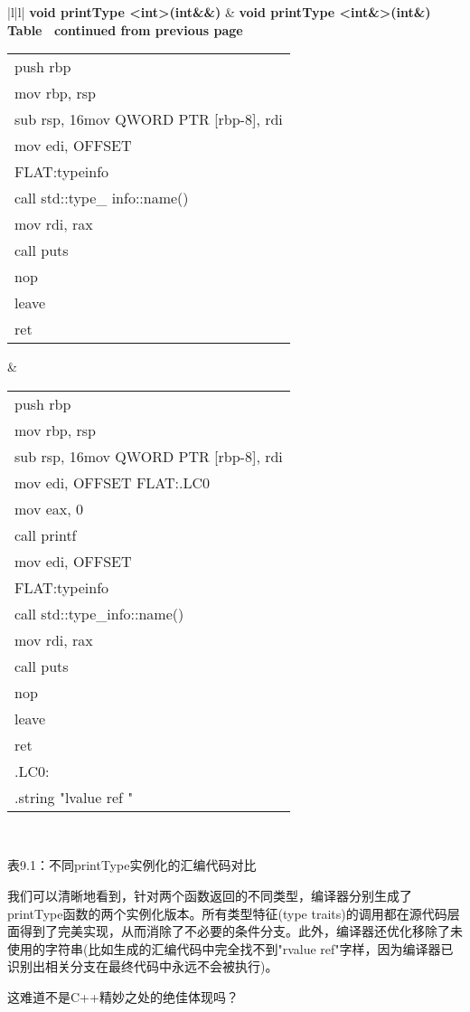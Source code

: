 \begin{longtable}{|l|l|}
\hline
\textbf{void printType <int>(int\&\&)} &
  \textbf{void printType <int\&>(int\&)} \\ \hline
\endfirsthead
%
%
{{\bfseries Table \thetable\ continued from previous page}} \\
\endhead
%
\begin{tabular}[c]{@{}l@{}}push rbp\\ mov rbp, rsp\\ sub rsp, 16mov QWORD PTR [rbp-8], rdi\\ mov edi, OFFSET \\                   FLAT:typeinfo \\ call std::type\_ info::name() \\ mov rdi, rax\\ call puts \\ nop \\ leave \\ ret\end{tabular} &
  \begin{tabular}[c]{@{}l@{}}push rbp\\ mov rbp, rsp\\ sub rsp, 16mov QWORD PTR [rbp-8], rdi\\ mov edi, OFFSET FLAT:.LC0 \\ mov eax, 0 \\ call printf \\ mov edi, OFFSET \\                  FLAT:typeinfo \\ call std::type\_info::name() \\ mov rdi, rax\\ call puts \\ nop \\ leave \\ ret \\   .LC0:\\     .string "lvalue ref "\end{tabular} \\ \hline
\end{longtable}

\begin{center}
表9.1：不同printType实例化的汇编代码对比
\end{center}

我们可以清晰地看到，针对两个函数返回的不同类型，编译器分别生成了printType函数的两个实例化版本。所有类型特征(type traits)的调用都在源代码层面得到了完美实现，从而消除了不必要的条件分支。此外，编译器还优化移除了未使用的字符串(比如生成的汇编代码中完全找不到"rvalue ref"字样，因为编译器已识别出相关分支在最终代码中永远不会被执行)。

这难道不是C++精妙之处的绝佳体现吗？





















